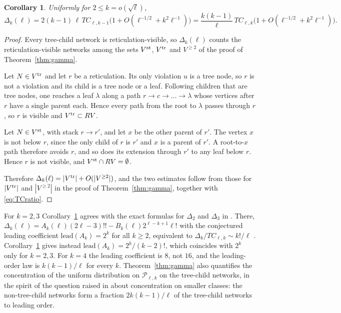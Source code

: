 \documentclass[11pt,a4paper]{article}
\newtheorem{corollary}[theorem]{Corollary}
\theoremstyle{definition}
\newcommand{\cP}{\mathcal{P}}
\begin{document}
\begin{corollary}\label{cor:RV}
Uniformly for $2\le k=o(\sqrt\ell)$,
\[
\Delta_k(\ell)=2(k-1)\,\ell\,TC_{\ell,k-1}\bigl(1+O(\ell^{-1/2}+k^2\ell^{-1})\bigr)=\frac{k(k-1)}{\ell}\,TC_{\ell,k}\bigl(1+O(\ell^{-1/2}+k^2\ell^{-1})\bigr).
\]
\end{corollary}

\begin{proof}
Every tree-child network is reticulation-visible, so $\Delta_k(\ell)$ counts the reticulation-visible networks among the sets $V^{\rm st}$, $V^{\rm tr}$ and $V^{\ge2}$ of the proof of Theorem~\ref{thm:gamma}.

Let $N\in V^{\rm tr}$ and let $r$ be a reticulation. Its only violation $u$ is a tree node, so $r$ is not a violation and its child is a tree node or a leaf. Following children that are tree nodes, one reaches a leaf $\lambda$ along a path $r\to c\to\dots\to\lambda$ whose vertices after $r$ have a single parent each. Hence every path from the root to $\lambda$ passes through $r$, so $r$ is visible and $V^{\rm tr}\subset RV$.

Let $N\in V^{\rm st}$, with stack $r\to r'$, and let $x$ be the other parent of $r'$. The vertex $x$ is not below $r$, since the only child of $r$ is $r'$ and $x$ is a parent of $r'$. A root-to-$x$ path therefore avoids $r$, and so does its extension through $r'$ to any leaf below $r$. Hence $r$ is not visible, and $V^{\rm st}\cap RV=\emptyset$.

Therefore $\Delta_k(\ell)=|V^{\rm tr}|+O(|V^{\ge2}|)$, and the two estimates follow from those for $|V^{\rm tr}|$ and $|V^{\ge2}|$ in the proof of Theorem~\ref{thm:gamma}, together with \eqref{eq:TCratio}.
\end{proof}

For $k=2,3$ Corollary~\ref{cor:RV} agrees with the exact formulas for $\Delta_2$ and $\Delta_3$ in \cite{Bat26}. There, $\Delta_k(\ell)=A_k(\ell)(2\ell-3)!!-B_k(\ell)2^{\ell-k+1}\ell!$ with the conjectured leading coefficient $\mathrm{lead}(A_k)=2^k$ for all $k\ge2$, equivalent to $\Delta_k/TC_{\ell,k}\sim k!/\ell$ \cite[Conj.~5.1]{Bat26}. Corollary~\ref{cor:RV} gives instead $\mathrm{lead}(A_k)=2^k/(k-2)!$, which coincides with $2^k$ only for $k=2,3$. For $k=4$ the leading coefficient is $8$, not $16$, and the leading-order law is $k(k-1)/\ell$ for every $k$. Theorem~\ref{thm:gamma} also quantifies the concentration of the uniform distribution on $\cP_{\ell,k}$ on the tree-child networks, in the spirit of the question raised in \cite{CFY} about concentration on smaller classes: the non-tree-child networks form a fraction $2k(k-1)/\ell$ of the tree-child networks to leading order.
\end{document}
